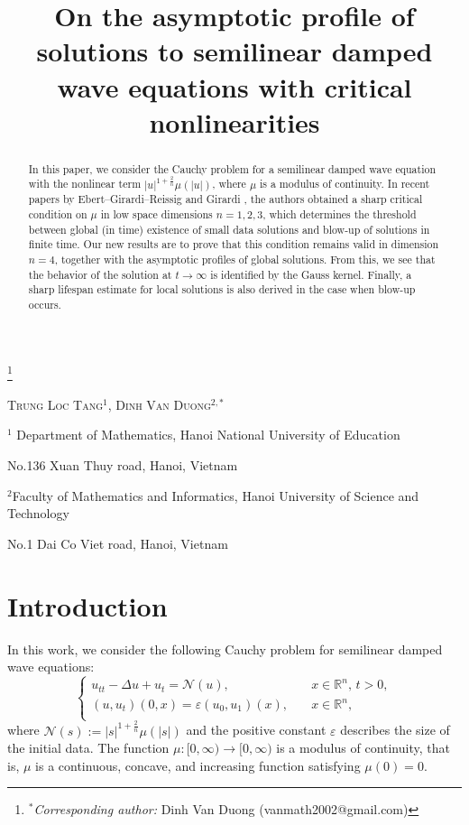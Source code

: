 \documentclass[11pt,reqno]{amsart}
\newcommand{\R}{\mathbb{R}}
\begin{document}
\title[semilinear damped wave equations]{On the asymptotic profile of solutions to semilinear damped wave equations with critical nonlinearities}

\thanks{$^* $\textit{Corresponding author:} Dinh Van Duong (vanmath2002@gmail.com)}

\maketitle
\centerline{\scshape  Trung Loc Tang$^{1}$, Dinh Van Duong$^{2,*}$ }
\medskip
{\footnotesize

{\footnotesize
	\centerline{$^1$ Department of Mathematics, Hanoi National University of Education}
	\centerline{No.136 Xuan Thuy road, Hanoi, Vietnam}}

	\centerline{$^2$Faculty of Mathematics and Informatics, Hanoi University of Science and Technology}
	\centerline{No.1 Dai Co Viet road, Hanoi, Vietnam}}


\begin{abstract}
    In this paper, we consider the Cauchy problem for a semilinear damped wave equation with the nonlinear term $|u|^{1+\frac{2}{n}}\mu(|u|)$, where $\mu$ is a modulus of continuity. In recent papers by Ebert–Girardi–Reissig \cite{EbeGirRei2020} and Girardi \cite{Girardi2024}, the authors obtained a sharp critical condition on $\mu$ in low space dimensions $n=1,2,3$, which determines the threshold between global (in time) existence of small data solutions and blow-up of solutions in finite time. Our new results are to prove that this condition remains valid in dimension $n=4$, together with the asymptotic profiles of global solutions. From this, we see that the behavior of the solution at $t \to \infty$ is identified by the Gauss kernel. Finally, a sharp lifespan estimate for local solutions is also derived in the case when blow-up occurs. 
\end{abstract}
\tableofcontents
\section{Introduction}
In this work, we consider the following Cauchy problem for semilinear damped wave equations:
\begin{equation} \label{Main.Eq.1}
\begin{cases}
u_{tt} -\Delta u + u_t= \mathcal{N}(u), &\quad x\in \R^n,\, t > 0, \\
(u, u_t)(0,x) = \varepsilon (u_0, u_1)(x), &\quad x\in \R^n, \\
\end{cases}
\end{equation}
where $\mathcal{N}(s) := |s|^{1+\frac{2}{n}}\mu(|s|)$ and the positive constant $\varepsilon$
describes the size of the initial data. The function $\mu : [0, \infty) \to [0, \infty)$ is a modulus of continuity, that is, $\mu$ is a continuous, concave, and increasing function satisfying $\mu(0) =0$. 
\end{document}
